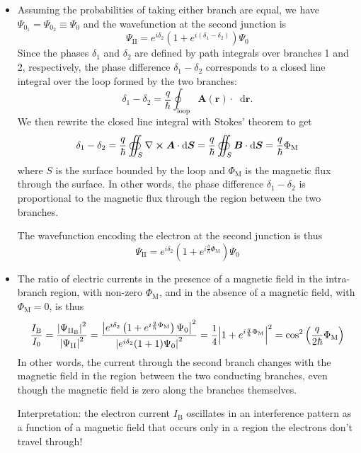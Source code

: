 \documentclass[11pt, a4paper]{article}
\newcommand{\diff}{\mathop{}\!\mathrm{d}} %
\renewcommand{\curl}{\nabla \cross}
\renewcommand{\vec}[1]{\bm{#1}}  %
\renewcommand{\r}{\vec{r}}  %
\newcommand{\A}{\vec{A}}  %
\newcommand{\B}{\vec{B}}  %
\renewcommand{\P}{\Psi}  %
\begin{document}
\begin{itemize}
	\item Assuming the probabilities of taking either branch are equal, we have $ \P_{0_{1}} = \P_{0_{2}} \equiv \P_{0} $ and the wavefunction at the second junction is
	\begin{equation*}
		\P_{\text{II}} = e^{i\delta_{2}}\left(1 + e^{i(\delta_{1} - \delta_{2})}\right)\P_{0}
	\end{equation*}
	Since the phases $ \delta_{1} $ and $\delta_{2} $ are defined by path integrals over branches 1 and 2, respectively, the phase difference $ \delta_{1} - \delta_{2} $ corresponds to a closed line integral over the loop formed by the two branches:
	\begin{equation*}
		\delta_{1} - \delta_{2} = \frac{q}{\hbar} \oint_{\text{loop}} \A(\r) \cdot \diff \r.
	\end{equation*}
	We then rewrite the closed line integral with Stokes' theorem to get
	\begin{equation*}
		\delta_{1} - \delta_{2} = \frac{q}{\hbar} \oiint_{S}\curl \A \cdot \diff \vec{S} = \frac{q}{\hbar}\oiint_{S} \B \cdot \diff \vec{S} = \frac{q}{\hbar}\Phi_{\text{M}}
	\end{equation*}
	where $ S $ is the surface bounded by the loop and $ \Phi_{\text{M}} $ is the magnetic flux through the surface. In other words, the phase difference $ \delta_{1} - \delta_{2} $ is proportional to the magnetic flux through the region between the two branches.
	
	The wavefunction encoding the electron at the second junction is thus
	\begin{equation*}
		\P_{\text{II}} = e^{i\delta_{2}}\left(1 + e^{i\frac{q}{\hbar}\Phi_{\text{M}}}\right)\P_{0}
	\end{equation*}
	
	\item The ratio of electric currents in the presence of a magnetic field in the intra-branch region, with non-zero $ \Phi_{\text{M}} $, and in the absence of a magnetic field, with $ \Phi_{\text{M}} = 0 $, is thus
	\begin{equation*}
		\frac{I_{\text{B}}}{I_{0}} = \frac{\abs{\P_{\text{II}_{\text{B}}}}^{2}}{\abs{\P_{\text{II}}}^{2}} = \frac{\abs{e^{i\delta_{2}}\left(1 + e^{i\frac{q}{\hbar}\Phi_{\text{M}}}\right)\P_{0}}^{2}}{\abs{e^{i\delta_{2}}(1 + 1)\P_{0}}^{2}} = \frac{1}{4}\abs{1 + e^{i\frac{q}{\hbar}\Phi_{\text{M}}}}^{2} = \cos^{2}\left(\frac{q}{2\hbar}\Phi_{\text{M}}\right)
	\end{equation*}
	In other words, the current through the second branch changes with the magnetic field in the region between the two conducting branches, even though the magnetic field is zero along the branches themselves. 
	
	Interpretation: the electron current $ I_{\text{B}} $ oscillates in an interference pattern as a function of a magnetic field that occurs only in a region the electrons don't travel through!
\end{itemize}
\end{document}
